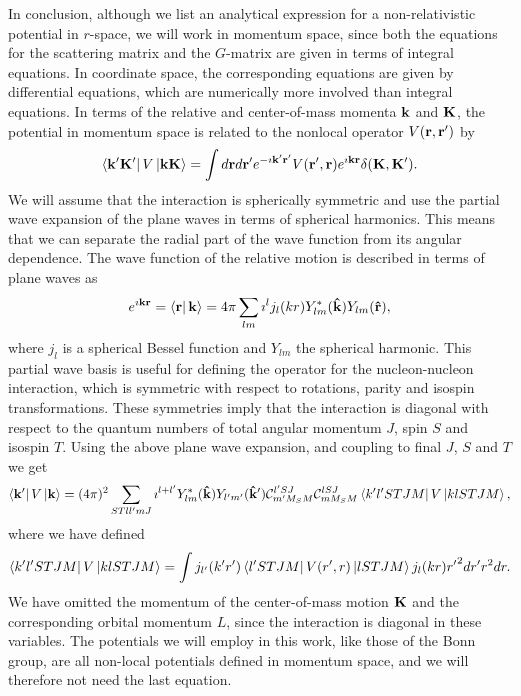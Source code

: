 In conclusion, although we list an analytical expression for 
a non-relativistic potential in $r$-space, we will work 
in momentum space, since both the equations for the scattering
matrix and the $G$-matrix are given in terms of integral equations.
In coordinate space, the corresponding equations are given by differential
equations, which are numerically more involved than integral equations.
In terms of the relative and center-of-mass momenta ${\bf k}$ and
${\bf K}$, the potential in momentum space is related to the nonlocal operator
$V({\bf r},{\bf r}')$ by
\begin{equation}
      \left\langle {\bf k'K'} \right|V \left| {\bf kK} \right\rangle =
       \int d {\bf r}d {\bf r'}
        e^{-\imath {\bf k'r'}}V({\bf r'},{\bf r}) e^{\imath {\bf kr}}
       \delta({\bf K},{\bf K'}).
\end{equation}
We will assume that the interaction is spherically symmetric and use
the partial wave expansion of the plane waves in
terms of spherical harmonics.
This means that we can separate the radial part of the wave function from its
angular dependence. The wave function of the relative motion is described
in terms of plane waves as
\begin{equation}
       e^{\imath {\bf kr}}  =
       \left\langle \bf r \right|{\bf k}\rangle =  4\pi \sum_{lm} \imath ^{l}
        j_{l} (kr) Y_{lm}^{*}({\bf \hat{k}}) Y_{lm}({\bf \hat{r}}),
\end{equation}
where $j_l$ is a spherical Bessel function and $Y_{lm}$ the
spherical harmonic.
This partial wave basis is useful for defining the operator for
the nucleon-nucleon interaction, which
is symmetric with respect to rotations, parity and
isospin transformations. These symmetries imply that the interaction is
diagonal with respect to the quantum numbers of total angular
momentum $J$, spin $S$ and isospin $T$. Using the above plane wave expansion,
and coupling to final $J$, $S$ and $T$ we get
\begin{equation}
      \left\langle {\bf k'} \right| V \left| {\bf k} \right\rangle
       = (4\pi)^2 \sum_{STll'mJ}
      \imath ^{l+l'} Y_{lm}^{*}({\bf \hat{k}}) Y_{l'm'}({\bf \hat{k}'})
      {\cal C}_{m'M_SM}^{l'SJ}{\cal C}_{mM_SM}^{lSJ}
      \left\langle k'l'STJM \right|V \left| klSTJM \right\rangle,
\label{eq:vpartial}
\end{equation}
where we have defined
\begin{equation}
    \left\langle k'l'STJM \right|V \left| klSTJM \right\rangle=
    \int   j_{l'}(k'r')\left\langle l'STJM \right|V(r',r)\left| lSTJM \right\rangle j_l(kr) {r'}^2 dr' r^2 dr.
\end{equation}
We have omitted the momentum of the center-of-mass motion ${\bf K}$ and the 
corresponding orbital momentum $L$, since the interaction is diagonal
in these variables. The potentials we will employ in this work, like
those of the Bonn group, are all non-local potentials defined in 
momentum space, and we will therefore not need the last equation.





